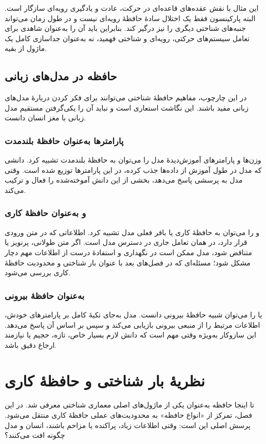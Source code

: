 این مثال با نقش عقده‌های قاعده‌ای در حرکت، عادت و یادگیری رویه‌ای سازگار است. البته پارکینسون فقط یک اختلال سادهٔ حافظهٔ رویه‌ای نیست و در طول زمان می‌تواند جنبه‌های شناختی دیگری را نیز درگیر کند. بنابراین باید آن را به‌عنوان شاهدی برای تعامل سیستم‌های حرکتی، رویه‌ای و شناختی فهمید، نه به‌عنوان جداسازی کامل یک ماژول از بقیه.

\subsection{حافظه در مدل‌های زبانی}
در این چارچوب، مفاهیم حافظهٔ شناختی می‌توانند برای فکر کردن دربارهٔ مدل‌های زبانی مفید باشند. این نگاشت استعاری است و نباید آن را یکی‌گرفتن مستقیم مدل زبانی با مغز انسان دانست.

\subsubsection{پارامترها به‌عنوان حافظهٔ بلندمدت}
وزن‌ها و پارامترهای آموزش‌دیدهٔ مدل را می‌توان به حافظهٔ بلندمدت تشبیه کرد. دانشی که مدل در طول آموزش از داده‌ها جذب کرده، در این پارامترها توزیع شده است. وقتی مدل به پرسشی پاسخ می‌دهد، بخشی از این دانش آموخته‌شده را فعال و ترکیب می‌کند.

\subsubsection{ و  به‌عنوان حافظهٔ کاری}
 و  را می‌توان به حافظهٔ کاری یا بافر فعلی مدل تشبیه کرد. اطلاعاتی که در متن ورودی قرار دارد، در همان تعامل جاری در دسترس مدل است. اگر متن طولانی، پرنویز یا متناقض شود، مدل ممکن است در نگهداری و استفادهٔ درست از اطلاعات مهم دچار مشکل شود؛ مسئله‌ای که در فصل‌های بعد با عنوان بار شناختی و محدودیت حافظهٔ کاری بررسی می‌شود.

\subsubsection{ به‌عنوان حافظهٔ بیرونی}
 یا  را می‌توان شبیه حافظهٔ بیرونی دانست. مدل به‌جای تکیهٔ کامل بر پارامترهای خودش، اطلاعات مرتبط را از منبعی بیرونی بازیابی می‌کند و سپس بر اساس آن پاسخ می‌دهد. این سازوکار به‌ویژه وقتی مهم است که دانش لازم بسیار خاص، تازه، حجیم یا نیازمند ارجاع دقیق باشد.

\section{نظریهٔ بار شناختی و حافظهٔ کاری}
تا اینجا حافظه به‌عنوان یکی از ماژول‌های اصلی معماری شناختی معرفی شد. در این فصل، تمرکز از «انواع حافظه» به محدودیت‌های عملی حافظهٔ کاری منتقل می‌شود. پرسش اصلی این است: وقتی اطلاعات زیاد، پراکنده یا مزاحم باشند، انسان و مدل چگونه افت می‌کنند؟

